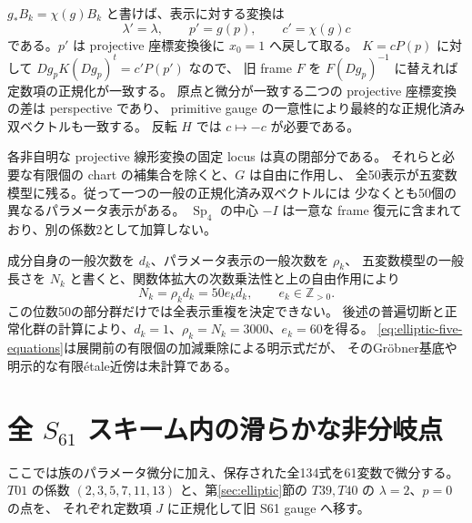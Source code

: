 \documentclass[11pt,a4paper]{ltjsarticle}
\DeclareMathOperator{\Sp}{Sp}
\theoremstyle{remark}
\begin{document}
$g_*B_k=\chi(g)B_k$ と書けば、表示に対する変換は
\[
 \lambda'=\lambda,\qquad p'=g(p),\qquad c'=\chi(g)c
\]
である。$p'$ は projective 座標変換後に $x_0=1$ へ戻して取る。
$K=cP(p)$ に対して $Dg_p K(Dg_p)^t=c'P(p')$ なので、
旧 frame $F$ を $F(Dg_p)^{-1}$ に替えれば定数項の正規化が一致する。
原点と微分が一致する二つの projective 座標変換の差は perspective であり、
primitive gauge の一意性により最終的な正規化済み双ベクトルも一致する。
反転 $H$ では $c\mapsto-c$ が必要である。

各非自明な projective 線形変換の固定 locus は真の閉部分である。
それらと必要な有限個の chart の補集合を除くと、$G$ は自由に作用し、
全50表示が五変数模型に残る。従って一つの一般の正規化済み双ベクトルには
少なくとも50個の異なるパラメータ表示がある。
$\Sp_4$ の中心 $-I$ は一意な frame 復元に含まれており、別の係数2として加算しない。

成分自身の一般次数を $d_k$、パラメータ表示の一般次数を $\rho_k$、
五変数模型の一般長さを $N_k$ と書くと、関数体拡大の次数乗法性と上の自由作用により
\begin{equation}\label{eq:elliptic-degree-redundancy}
 N_k=\rho_kd_k=50e_kd_k,\qquad e_k\in\mathbb Z_{>0}.
\end{equation}
この位数50の部分群だけでは全表示重複を決定できない。
後述の普遍切断と正常化群の計算により、$d_k=1$、$\rho_k=N_k=3000$、$e_k=60$を得る。
\eqref{eq:elliptic-five-equations}は展開前の有限個の加減乗除による明示式だが、
そのGr\"obner基底や明示的な有限\'etale近傍は未計算である。

\section{全 $S_{61}$ スキーム内の滑らかな非分岐点}\label{sec:etale}
ここでは族のパラメータ微分に加え、保存された全134式を61変数で微分する。
$T01$ の係数 $(2,3,5,7,11,13)$ と、第\ref{sec:elliptic}節の $T39,T40$ の $\lambda=2$、$p=0$ の点を、
それぞれ定数項 $J$ に正規化して旧 S61 gauge へ移す。
\end{document}
